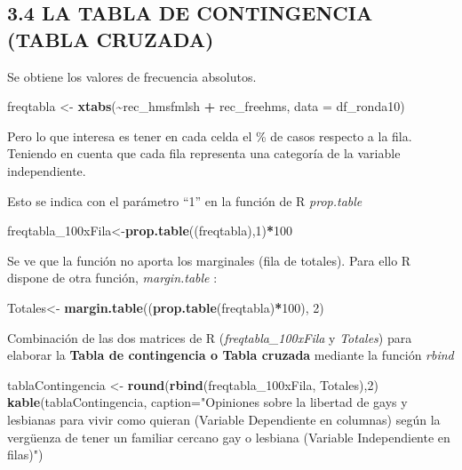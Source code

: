 \documentclass[
  12 pt,
  a4paper,
]{article}
\newenvironment{Shaded}{\begin{snugshade}}{\end{snugshade}}
\newcommand{\AttributeTok}[1]{\textcolor[rgb]{0.13,0.29,0.53}{#1}}
\newcommand{\DecValTok}[1]{\textcolor[rgb]{0.00,0.00,0.81}{#1}}
\newcommand{\FunctionTok}[1]{\textcolor[rgb]{0.13,0.29,0.53}{\textbf{#1}}}
\newcommand{\NormalTok}[1]{#1}
\newcommand{\OtherTok}[1]{\textcolor[rgb]{0.56,0.35,0.01}{#1}}
\newcommand{\SpecialCharTok}[1]{\textcolor[rgb]{0.81,0.36,0.00}{\textbf{#1}}}
\newcommand{\StringTok}[1]{\textcolor[rgb]{0.31,0.60,0.02}{#1}}
\begin{document}
\subsection{3.4 LA TABLA DE CONTINGENCIA (TABLA
CRUZADA)}\label{la-tabla-de-contingencia-tabla-cruzada}

Se obtiene los valores de frecuencia absolutos.

\begin{Shaded}
\begin{Highlighting}[]
\NormalTok{freqtabla }\OtherTok{\textless{}{-}} \FunctionTok{xtabs}\NormalTok{(}\SpecialCharTok{\textasciitilde{}}\NormalTok{rec\_hmsfmlsh }\SpecialCharTok{+}\NormalTok{ rec\_freehms, }\AttributeTok{data =}\NormalTok{ df\_ronda10)}
\end{Highlighting}
\end{Shaded}

Pero lo que interesa es tener en cada celda el \% de casos respecto a la
fila. Teniendo en cuenta que cada fila representa una categoría de la
variable independiente.

Esto se indica con el parámetro ``1'' en la función de R
\emph{prop.table}

\begin{Shaded}
\begin{Highlighting}[]
\NormalTok{freqtabla\_100xFila}\OtherTok{\textless{}{-}}\FunctionTok{prop.table}\NormalTok{((freqtabla),}\DecValTok{1}\NormalTok{)}\SpecialCharTok{*}\DecValTok{100}
\end{Highlighting}
\end{Shaded}

Se ve que la función no aporta los marginales (fila de totales). Para
ello R dispone de otra función, \emph{margin.table} :

\begin{Shaded}
\begin{Highlighting}[]
\NormalTok{Totales}\OtherTok{\textless{}{-}} \FunctionTok{margin.table}\NormalTok{((}\FunctionTok{prop.table}\NormalTok{(freqtabla)}\SpecialCharTok{*}\DecValTok{100}\NormalTok{), }\DecValTok{2}\NormalTok{)}
\end{Highlighting}
\end{Shaded}

Combinación de las dos matrices de R (\emph{freqtabla\_100xFila} y
\emph{Totales}) para elaborar la \textbf{Tabla de contingencia o Tabla
cruzada} mediante la función \emph{rbind}

\begin{Shaded}
\begin{Highlighting}[]
\NormalTok{tablaContingencia }\OtherTok{\textless{}{-}} \FunctionTok{round}\NormalTok{(}\FunctionTok{rbind}\NormalTok{(freqtabla\_100xFila, Totales),}\DecValTok{2}\NormalTok{)}
\FunctionTok{kable}\NormalTok{(tablaContingencia, }\AttributeTok{caption=}\StringTok{"Opiniones sobre la libertad de gays y lesbianas para vivir como quieran (Variable Dependiente en columnas) según la vergüenza de tener un familiar cercano gay o lesbiana (Variable Independiente en filas)"}\NormalTok{)}
\end{Highlighting}
\end{Shaded}
\end{document}
